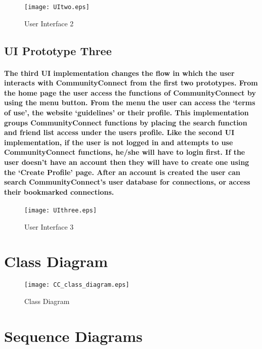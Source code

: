 \documentclass[12pt]{article}
\begin{document}
      \begin{figure}[H]
              \texttt{[image: UItwo.eps]}
              \caption{User Interface 2}
              \label{fig: User Interface 2}
      \end{figure}
\restoregeometry

  \subsection{\bf UI Prototype Three}
      \paragraph{\normalfont \indent The third UI implementation changes the flow in which the user interacts with CommunityConnect from the first two prototypes. From the home page the user access the functions of CommunityConnect by using the menu button. From the menu the user can access the ‘terms of use’, the website ‘guidelines’ or their profile. This implementation groups CommunityConnect functions by placing the search function and friend list access under the users profile. Like the second UI implementation, if the user is not logged in and attempts to use CommunityConnect functions, he/she will have to login first. If the user doesn't have an account then they will have to create one using the ‘Create Profile’ page. After an account is created the user can search CommunityConnect’s user database for connections, or access their bookmarked connections.
      }

    \begin{figure}[H]
            \texttt{[image: UIthree.eps]}
            \caption{User Interface 3}
            \label{fig: User Interface 3}
    \end{figure}
\restoregeometry

\section{\bf Class Diagram}
      \begin{figure}[H]
              \texttt{[image: CC\_class\_diagram.eps]}
                \caption{Class Diagram}
                \label{fig: Class Diagram}
      \end{figure}


\newpage
\section{\bf Sequence Diagrams}
\end{document}

